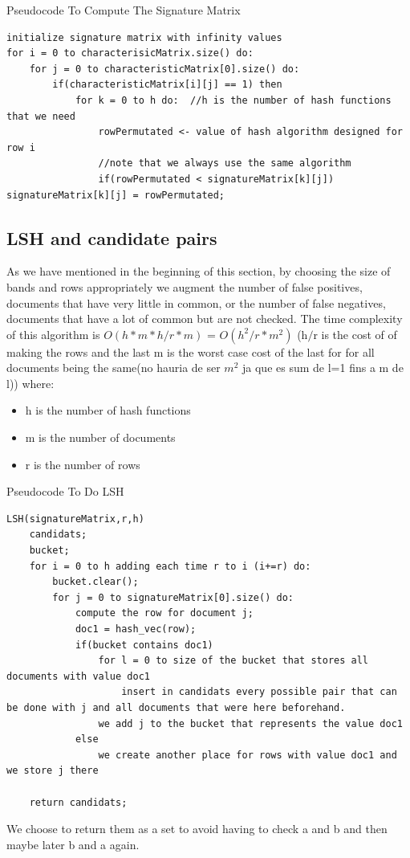 \documentclass[12pt]{article}
\begin{document}
 \begin{center}
\begin{large}
Pseudocode To Compute The Signature Matrix
\end{large}
\end{center}
\begin{lstlisting}
initialize signature matrix with infinity values
for i = 0 to characterisicMatrix.size() do:
	for j = 0 to characteristicMatrix[0].size() do:
		if(characteristicMatrix[i][j] == 1) then
			for k = 0 to h do:	//h is the number of hash functions that we need
				rowPermutated <- value of hash algorithm designed for row i
				//note that we always use the same algorithm
				if(rowPermutated < signatureMatrix[k][j]) signatureMatrix[k][j] = rowPermutated;
\end{lstlisting}
\medskip


\subsection{LSH and candidate pairs}
As we have mentioned in the beginning of this section, by choosing the size of bands and rows appropriately we augment the number of false positives, documents that have very little in common, or the number of false negatives, documents that have a lot of common but are not checked. The time complexity of this algorithm is $O(h * m * h/r * m )$ = $O(h^2 /r * m^2)$ (h$/$r is the cost of of making the rows and the last m is the worst case cost of the last for for all documents being the same(no hauria de ser $m^2$ ja que es sum de l=1 fins a m de l)) where: 
\begin{itemize}
\item h is the number of hash functions
\item m is the number of documents
\item r is the number of rows
\end{itemize}
 \begin{center}
\begin{large}
Pseudocode To Do LSH
\end{large}
\end{center}

\begin{lstlisting}
LSH(signatureMatrix,r,h)
    candidats;                     
    bucket;
    for i = 0 to h adding each time r to i (i+=r) do:
        bucket.clear();
        for j = 0 to signatureMatrix[0].size() do:
            compute the row for document j;
            doc1 = hash_vec(row);
            if(bucket contains doc1)
                for l = 0 to size of the bucket that stores all documents with value doc1 
                    insert in candidats every possible pair that can be done with j and all documents that were here beforehand.
                we add j to the bucket that represents the value doc1
            else
                we create another place for rows with value doc1 and we store j there

    return candidats;

 \end{lstlisting}
 We choose to return them as a set to avoid having to check a and b and then maybe later b and a again.
\newline
\end{document}
